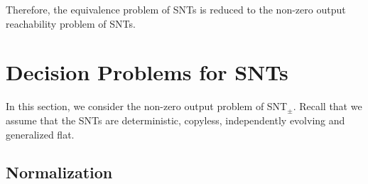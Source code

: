 \documentclass[runningheads,a4paper]{llncs}
\def\Ss{{\mathcal{S} }}
\newcommand{\yfc}[1]{\color{blue} {YF: #1 :FY} \color{black}}
\newcommand{\SDSIT}{SDSIT}
\begin{document}
Therefore, the equivalence problem of SNTs is reduced to the non-zero output reachability problem of SNTs.

\section{Decision Problems for SNTs}

In this section, we consider the non-zero output problem of SNT$_{\pm}$. Recall that we assume that the SNTs are deterministic, copyless, independently evolving and generalized flat.

%






\subsection{Normalization}
\end{document}
